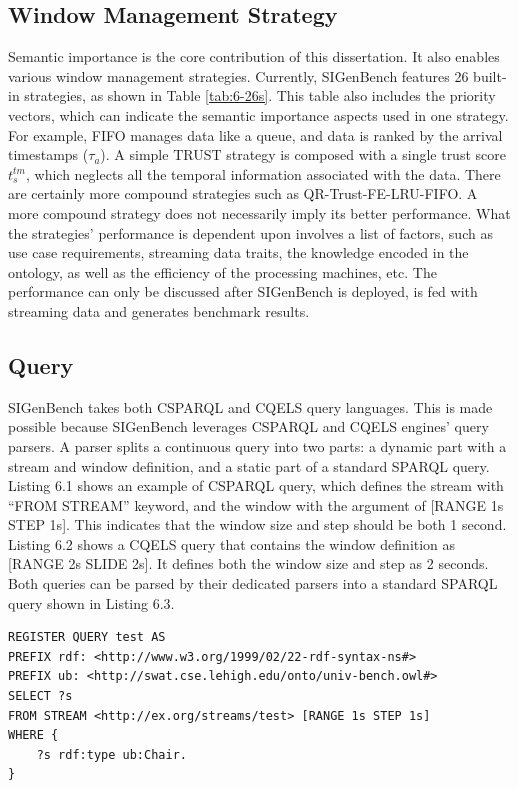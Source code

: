 \subsection{Window Management Strategy}
Semantic importance is the core contribution of this dissertation.
It also enables various window management strategies.
Currently, SIGenBench features 26 built-in strategies, as shown in Table \ref{tab:6-26s}.
This table also includes the priority vectors, which can indicate the semantic importance aspects used in one strategy. 
For example, FIFO manages data like a queue, and data is ranked by the arrival timestamps ($\tau_{a}$). 
A simple TRUST strategy is composed with a single trust score $t^{tm}_{s}$, which neglects all the temporal information associated with the data. 
There are certainly more compound strategies such as QR-Trust-FE-LRU-FIFO. 
A more compound strategy does not necessarily imply its better performance.
What the strategies' performance is dependent upon involves a list of factors, such as use case requirements, streaming data traits, the knowledge encoded in the ontology, as well as the efficiency of the processing machines, etc.
The performance can only be discussed after SIGenBench is deployed, is fed with streaming data and generates benchmark results. 
%
\subsection{Query}
SIGenBench takes both CSPARQL and CQELS query languages. 
This is made possible because SIGenBench leverages CSPARQL and CQELS engines' query parsers.
A parser splits a continuous query into two parts: a dynamic part with a stream and window definition, and a static part of a standard SPARQL query. 
Listing 6.1 shows an example of CSPARQL query, which defines the stream with ``FROM STREAM'' keyword, and the window with the argument of [RANGE 1s STEP 1s].
This indicates that the window size and step should be both 1 second.
Listing 6.2 shows a CQELS query that contains the window definition as [RANGE 2s SLIDE 2s].
It defines both the window size and step as 2 seconds.
Both queries can be parsed by their dedicated parsers into a standard SPARQL query shown in Listing 6.3.

\begin{lstlisting}[language=SPARQL, caption={CSPARQL Query Example},basicstyle=\small,frame=single]
REGISTER QUERY test AS
PREFIX rdf: <http://www.w3.org/1999/02/22-rdf-syntax-ns#>
PREFIX ub: <http://swat.cse.lehigh.edu/onto/univ-bench.owl#>
SELECT ?s
FROM STREAM <http://ex.org/streams/test> [RANGE 1s STEP 1s]
WHERE {	
	?s rdf:type ub:Chair.
}
\end{lstlisting}


